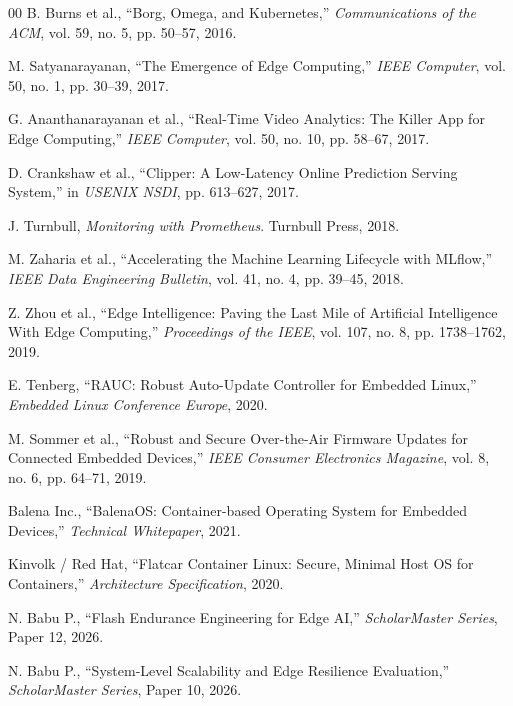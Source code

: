 \documentclass[conference]{IEEEtran}
\begin{document}
\begin{thebibliography}{00}
 B. Burns et al., ``Borg, Omega, and Kubernetes,'' \textit{Communications of the ACM}, vol. 59, no. 5, pp. 50--57, 2016.

 M. Satyanarayanan, ``The Emergence of Edge Computing,'' \textit{IEEE Computer}, vol. 50, no. 1, pp. 30--39, 2017.

 G. Ananthanarayanan et al., ``Real-Time Video Analytics: The Killer App for Edge Computing,'' \textit{IEEE Computer}, vol. 50, no. 10, pp. 58--67, 2017.

 D. Crankshaw et al., ``Clipper: A Low-Latency Online Prediction Serving System,'' in \textit{USENIX NSDI}, pp. 613--627, 2017.

 J. Turnbull, \textit{Monitoring with Prometheus}. Turnbull Press, 2018.

 M. Zaharia et al., ``Accelerating the Machine Learning Lifecycle with MLflow,'' \textit{IEEE Data Engineering Bulletin}, vol. 41, no. 4, pp. 39--45, 2018.

 Z. Zhou et al., ``Edge Intelligence: Paving the Last Mile of Artificial Intelligence With Edge Computing,'' \textit{Proceedings of the IEEE}, vol. 107, no. 8, pp. 1738--1762, 2019.

 E. Tenberg, ``RAUC: Robust Auto-Update Controller for Embedded Linux,'' \textit{Embedded Linux Conference Europe}, 2020.

 M. Sommer et al., ``Robust and Secure Over-the-Air Firmware Updates for Connected Embedded Devices,'' \textit{IEEE Consumer Electronics Magazine}, vol. 8, no. 6, pp. 64--71, 2019.

 Balena Inc., ``BalenaOS: Container-based Operating System for Embedded Devices,'' \textit{Technical Whitepaper}, 2021.

 Kinvolk / Red Hat, ``Flatcar Container Linux: Secure, Minimal Host OS for Containers,'' \textit{Architecture Specification}, 2020.

 N. Babu P., ``Flash Endurance Engineering for Edge AI,'' \textit{ScholarMaster Series}, Paper 12, 2026.

 N. Babu P., ``System-Level Scalability and Edge Resilience Evaluation,'' \textit{ScholarMaster Series}, Paper 10, 2026.

\end{thebibliography}
\end{document}
